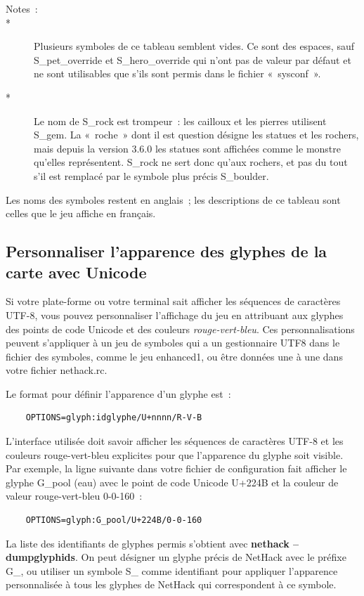 \documentclass[titlepage]{article}
\begin{document}
\begin{description}
\item[{Notes~:}]

\item[{*}]
Plusieurs symboles de ce tableau semblent vides.
Ce sont des espaces, sauf S\_pet\_override et S\_hero\_override qui n'ont pas
de valeur par défaut et ne sont utilisables que s'ils sont permis dans le
fichier «~sysconf~».

\item[{*}]
Le nom de S\_rock est trompeur~: les cailloux et les pierres utilisent
S\_gem.
La «~roche~» dont il est question désigne les statues et les
rochers, mais depuis la version 3.6.0 les statues sont affichées comme le
monstre qu'elles représentent.
S\_rock ne sert donc qu'aux rochers, et pas du tout s'il est remplacé par
le symbole plus précis S\_boulder.

\end{description}

Les noms des symboles restent en anglais~; les descriptions de ce
tableau sont celles que le jeu affiche en français.

\subsection{Personnaliser l'apparence des glyphes de la carte avec Unicode}



Si votre plate-forme ou votre terminal sait afficher les séquences de
caractères UTF-8, vous pouvez personnaliser l'affichage du jeu en
attribuant aux glyphes des points de code Unicode et des couleurs
\textit{rouge-vert-bleu}.
Ces personnalisations peuvent s'appliquer à un jeu de symboles qui a un
gestionnaire UTF8 dans le fichier des symboles, comme le jeu enhanced1, ou
être données une à une dans votre fichier nethack.rc.


Le format pour définir l'apparence d'un glyphe est~:
\begin{verbatim}
    OPTIONS=glyph:idglyphe/U+nnnn/R-V-B
\end{verbatim}


L'interface utilisée doit savoir afficher les séquences de caractères
UTF-8 et les couleurs rouge-vert-bleu explicites pour que l'apparence du
glyphe soit visible.
Par exemple, la ligne suivante dans votre fichier de configuration fait
afficher le glyphe G\_pool (eau) avec le point de code Unicode U+224B et la
couleur de valeur rouge-vert-bleu 0-0-160~:
\begin{verbatim}
    OPTIONS=glyph:G_pool/U+224B/0-0-160
\end{verbatim}
La liste des identifiants de glyphes permis s'obtient avec
\textbf{nethack --dumpglyphids}.
On peut désigner un glyphe précis de NetHack avec le préfixe G\_, ou
utiliser un symbole S\_ comme identifiant pour appliquer l'apparence
personnalisée à tous les glyphes de NetHack qui correspondent à ce symbole.
\end{document}
